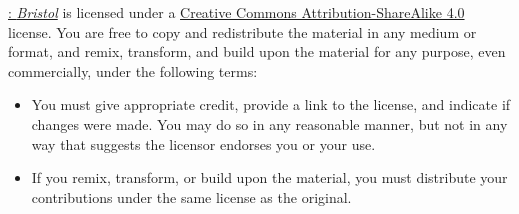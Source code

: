 \noindent \footnotesize  \href{\URL}{\forallx: \emph{Bristol}} is licensed under a \href{https://creativecommons.org/licenses/by-sa/4.0/}{Creative Commons Attribution-ShareAlike 4.0} license. 
You are free to copy and redistribute the material in any medium or format, and  remix, transform, and build upon the material for any purpose, even commercially, under the following terms:
\begin{itemize}
\item You must give appropriate credit, provide a link to the license, and indicate if changes were made. You may do so in any reasonable manner, but not in any way that suggests the licensor endorses you or your use.
\item If you remix, transform, or build upon the material, you must distribute your contributions under the same license as the original.
\end{itemize}

\vfill\noindent


%
\normalsize 
